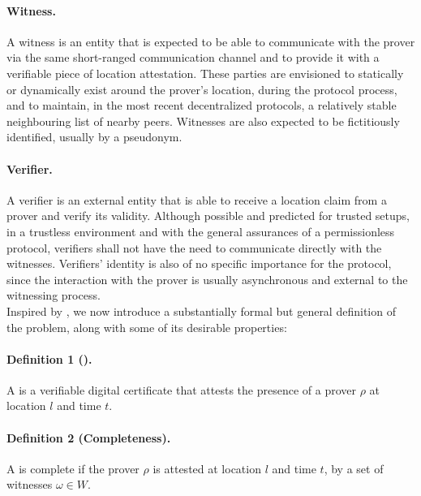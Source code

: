 \paragraph{Witness.} A witness is an entity that is expected to be able to communicate with the prover via the same short-ranged communication channel and to provide it with a verifiable piece of location attestation. These parties are envisioned to statically or dynamically exist around the prover's location, during the protocol process, and to maintain, in the most recent decentralized protocols, a relatively stable neighbouring list of nearby peers. Witnesses are also expected to be fictitiously identified, usually by a pseudonym.

\paragraph{Verifier.} A verifier is an external entity that is able to receive a location claim from a prover and verify its validity. Although possible and predicted for trusted setups, in a trustless environment and with the general assurances of a permissionless protocol, verifiers shall not have the need to communicate directly with the witnesses. Verifiers' identity is also of no specific importance for the protocol, since the interaction with the prover is usually asynchronous and external to the witnessing process. \\


Inspired by \cite{nasrulin2018robust, dupin2018location}, we now introduce a substantially formal but general definition of the \pol{} problem, along with some of its desirable properties:

\paragraph{Definition 1 (\pol{}).} A \pol{} is a verifiable digital certificate that attests the presence of a prover $\rho$ at location $l$ and time $t$.

\paragraph{Definition 2 (Completeness).} A \pol{} is complete if the prover $\rho$ is attested at location $l$ and time $t$, by a set of witnesses $\omega \in W$.

